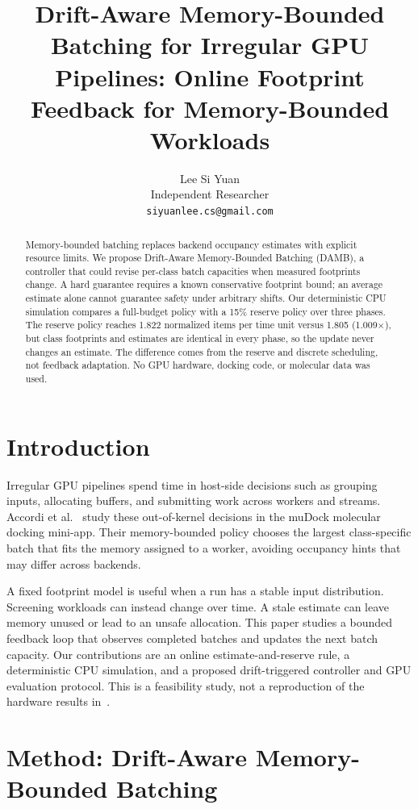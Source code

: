 \documentclass[11pt]{article}
\title{Drift-Aware Memory-Bounded Batching for Irregular GPU Pipelines: Online Footprint Feedback for Memory-Bounded Workloads}
\author{Lee Si Yuan \\
  Independent Researcher \\
  \texttt{siyuanlee.cs@gmail.com}}
\begin{document}
\maketitle
\begin{abstract}
Memory-bounded batching replaces backend occupancy estimates with explicit resource limits. We propose Drift-Aware Memory-Bounded Batching (DAMB), a controller that could revise per-class batch capacities when measured footprints change. A hard guarantee requires a known conservative footprint bound; an average estimate alone cannot guarantee safety under arbitrary shifts. Our deterministic CPU simulation compares a full-budget policy with a 15\% reserve policy over three phases. The reserve policy reaches 1.822 normalized items per time unit versus 1.805 (1.009$\times$), but class footprints and estimates are identical in every phase, so the update never changes an estimate. The difference comes from the reserve and discrete scheduling, not feedback adaptation. No GPU hardware, docking code, or molecular data was used.
\end{abstract}

\section{Introduction}
Irregular GPU pipelines spend time in host-side decisions such as grouping inputs, allocating buffers, and submitting work across workers and streams. Accordi et al.~\citep{accordi2026} study these out-of-kernel decisions in the muDock molecular docking mini-app. Their memory-bounded policy chooses the largest class-specific batch that fits the memory assigned to a worker, avoiding occupancy hints that may differ across backends.

A fixed footprint model is useful when a run has a stable input distribution. Screening workloads can instead change over time. A stale estimate can leave memory unused or lead to an unsafe allocation. This paper studies a bounded feedback loop that observes completed batches and updates the next batch capacity. Our contributions are an online estimate-and-reserve rule, a deterministic CPU simulation, and a proposed drift-triggered controller and GPU evaluation protocol. This is a feasibility study, not a reproduction of the hardware results in~\citep{accordi2026}.

\section{Method: Drift-Aware Memory-Bounded Batching}
\end{document}
